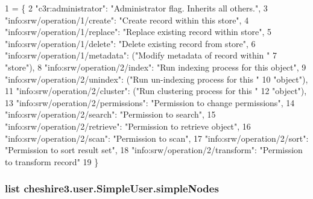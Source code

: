 \begin{DoxyCode}
1 = \{
2         \textcolor{stringliteral}{"c3r:administrator"}: \textcolor{stringliteral}{"Administrator flag. Inherits all others."},
3         \textcolor{stringliteral}{"info:srw/operation/1/create"}: \textcolor{stringliteral}{"Create record within this store"},
4         \textcolor{stringliteral}{"info:srw/operation/1/replace"}: \textcolor{stringliteral}{"Replace existing record within store"},
5         \textcolor{stringliteral}{"info:srw/operation/1/delete"}: \textcolor{stringliteral}{"Delete existing record from store"},
6         \textcolor{stringliteral}{"info:srw/operation/1/metadata"}: (\textcolor{stringliteral}{"Modify metadata of record within "}
7                                           \textcolor{stringliteral}{"store"}),
8         \textcolor{stringliteral}{"info:srw/operation/2/index"}: \textcolor{stringliteral}{"Run indexing process for this object"},
9         \textcolor{stringliteral}{"info:srw/operation/2/unindex"}: (\textcolor{stringliteral}{"Run un-indexing process for this "}
10                                          \textcolor{stringliteral}{"object"}),
11         \textcolor{stringliteral}{"info:srw/operation/2/cluster"}: (\textcolor{stringliteral}{"Run clustering process for this "}
12                                          \textcolor{stringliteral}{"object"}),
13         \textcolor{stringliteral}{"info:srw/operation/2/permissions"}: \textcolor{stringliteral}{"Permission to change permissions"},
14         \textcolor{stringliteral}{"info:srw/operation/2/search"}: \textcolor{stringliteral}{"Permission to search"},
15         \textcolor{stringliteral}{"info:srw/operation/2/retrieve"}: \textcolor{stringliteral}{"Permission to retrieve object"},
16         \textcolor{stringliteral}{"info:srw/operation/2/scan"}: \textcolor{stringliteral}{"Permission to scan"},
17         \textcolor{stringliteral}{"info:srw/operation/2/sort"}: \textcolor{stringliteral}{"Permission to sort result set"},
18         \textcolor{stringliteral}{"info:srw/operation/2/transform"}: \textcolor{stringliteral}{"Permission to transform record"}
19     \}
\end{DoxyCode}
\hypertarget{classcheshire3_1_1user_1_1_simple_user_af949c4b52a9385e0d69b19ecf3a47b00}{
\subsubsection[{simple\-Nodes}]{\setlength{\rightskip}{0pt plus 5cm}list cheshire3.\-user.\-Simple\-User.\-simple\-Nodes\hspace{0.3cm}{\ttfamily [static]}}}\label{classcheshire3_1_1user_1_1_simple_user_af949c4b52a9385e0d69b19ecf3a47b00}
